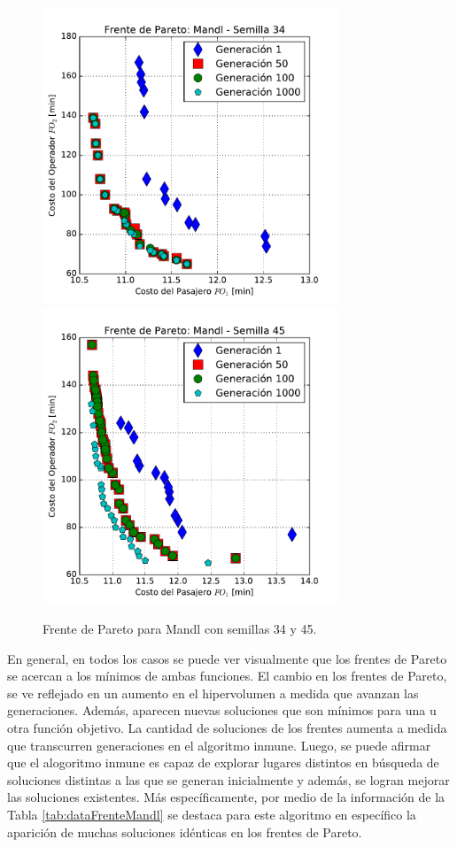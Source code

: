 \begin{figure}[p]
\centering
\includegraphics[width=0.79\textwidth]{img/frente_Mandl_s34}
\includegraphics[width=0.79\textwidth]{img/frente_Mandl_s45}
\caption{Frente de Pareto para Mandl con semillas 34 y 45.}
\label{fig:paretoMandl2}
\end{figure}

En general, en todos los casos se puede ver visualmente que los frentes de Pareto se acercan a los mínimos de ambas funciones. El cambio en los frentes de Pareto, se ve reflejado en un aumento en el hipervolumen a medida que avanzan las generaciones. Además, aparecen nuevas soluciones que son mínimos para una u otra función objetivo. La cantidad de soluciones de los frentes aumenta a medida que transcurren generaciones en el algoritmo inmune. Luego, se puede afirmar que el alogoritmo inmune es capaz de explorar lugares distintos en búsqueda de soluciones distintas a las que se generan inicialmente y además, se logran mejorar las soluciones existentes. Más específicamente, por medio de la información de la Tabla \ref{tab:dataFrenteMandl} se destaca para este algoritmo en específico la aparición de muchas soluciones idénticas en los frentes de Pareto. 

